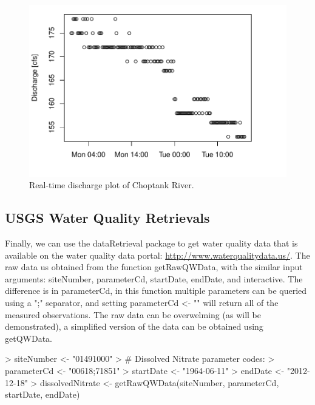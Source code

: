 \documentclass[a4paper,11pt]{article}
\begin{document}
\begin{figure}
\begin{center}
\includegraphics{dataRetrieval-fig2}
\end{center}
\caption{Real-time discharge plot of Choptank River.}
\end{figure}


\subsection{USGS Water Quality Retrievals}
Finally, we can use the dataRetrieval package to get water quality data that is available on the water quality data portal: \url{http://www.waterqualitydata.us/}. The raw data us obtained from the function  getRawQWData, with the similar input arguments: siteNumber, parameterCd, startDate, endDate, and interactive. The difference is in parameterCd, in this function multiple parameters can be queried using a ";" separator, and setting parameterCd <- "" will return all of the measured observations. The raw data can be overwelming (as will be demonstrated), a simplified version of the data can be obtained using getQWData.


\begin{Schunk}
\begin{Sinput}
> siteNumber <- "01491000" 
> # Dissolved Nitrate parameter codes:
> parameterCd <- "00618;71851"  
> startDate <- "1964-06-11"
> endDate <- "2012-12-18"
> dissolvedNitrate <- getRawQWData(siteNumber, parameterCd, 
       startDate, endDate)
\end{Sinput}
\end{Schunk}
\end{document}
